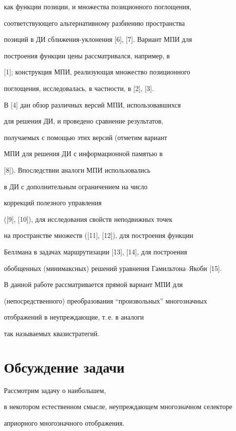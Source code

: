 как функции позиции, и множества позиционного поглощения,


соответствующего альтернативному разбиению пространства


позиций в ДИ сближения-уклонения [6], [7]. Вариант МПИ для


построения функции цены рассматривался, например, в


[1]; конструкция МПИ, реализующая множество позиционного


поглощения, исследовалась, в частности, в [2], [3].


В [4] дан обзор различных версий МПИ, использовавшихся


для решения ДИ, и проведено сравнение результатов,


получаемых с помощью этих версий (отметим вариант


МПИ для решения ДИ с информационной памятью в


[8]). Впоследствии аналоги МПИ использовались


в ДИ с дополнительным ограничением на число


коррекций полезного управления


([9], [10]), для исследования свойств неподвижных точек


на пространстве множеств ([11], [12]), для построения функции


Беллмана в задачах маршрутизации [13], [14], для построения


обобщенных (минимаксных) решений уравнения Гамильтона--Якоби [15].


В данной работе рассматривается прямой вариант МПИ для


(непосредственного) преобразования ``произвольных'' многозначных


отображений в неупреждающие, т.\,е. в аналоги


так называемых квазистратегий.





\section{Обсуждение задачи}





Рассмотрим задачу о наибольшем,


в некотором естественном смысле, неупреждающем многозначном селекторе


априорного многозначного отображения.


